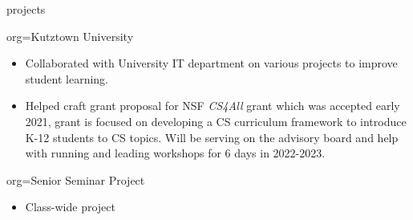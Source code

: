 \documentclass{resume}
\begin{document}
\begin{ResumeSection}{projects}
    \begin{ResumeSubsection}{org={Kutztown University}}
        \begin{itemize}
            \item Collaborated with University IT department on various projects to improve student learning. 
            \item Helped craft grant proposal for NSF \emph{CS4All} grant which was accepted early 2021,
            grant is focused on developing a CS curriculum framework to introduce K-12 students to CS topics.  
            Will be serving on the advisory board and help with running and leading workshops for 6 days 
            in 2022-2023. 
        \end{itemize}
    \end{ResumeSubsection}
    \begin{ResumeSubsection}{org={Senior Seminar Project}}
        \begin{itemize}
            \item Class-wide project 
        \end{itemize}
    \end{ResumeSubsection}
\end{ResumeSection}
\end{document}
